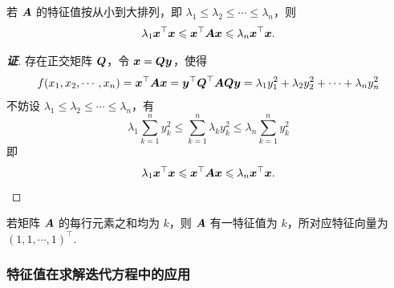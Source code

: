\begin{theorem}[特征值不等式]
    \label{tzzbds}若 $\vb*{A}$ 的特征值按从小到大排列，即 $\lambda_1\leqslant \lambda_2\leqslant \cdots\leqslant \lambda_n$，则 $$\lambda_1\vb*{x}^\top\vb*{x}\leqslant \vb*{x}^\top\vb*{Ax}\leqslant \lambda_n\vb*{x}^\top\vb*{x}.$$
\end{theorem}
\begin{proof}[{\songti \textbf{证}}]
    存在正交矩阵 $\vb*{Q}$，令 $\vb*{x}=\vb*{Qy}$，使得 $$f(x_1,x_2,\cdots,x_n)=\vb*{x}^\top\vb*{Ax}=\vb*{y}^\top\vb*{Q}^\top\vb*{AQy}=\lambda_1y_1^2+\lambda_2y_2^2+\cdots+\lambda_ny_n^2$$
    不妨设 $\lambda_1\leqslant \lambda_2\leqslant\cdots\leqslant\lambda_n$，有 
    $$\lambda_1\sum_{k=1}^{n}y_k^2\leqslant \sum_{k=1}^{n}\lambda_ky_k^2\leqslant \lambda_n\sum_{k=1}^{n}y_k^2$$
    即 $$\lambda_1\vb*{x}^\top\vb*{x}\leqslant \vb*{x}^\top\vb*{Ax}\leqslant \lambda_n\vb*{x}^\top\vb*{x}.$$
\end{proof}

\begin{theorem}[行均和定理]
    \label{hangjunhedl}若矩阵 $\vb*{A}$ 的每行元素之和均为 $k$，则 $\vb*{A}$ 有一特征值为 $k$，所对应特征向量为 $(1,1,\cdots,1)^\top.$
\end{theorem}

\subsubsection{特征值在求解迭代方程中的应用}

